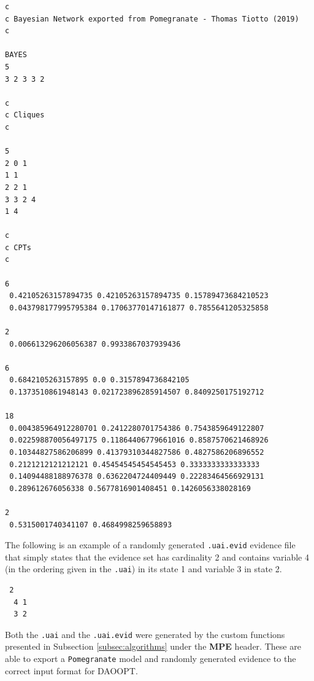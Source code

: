 \begin{minipage}{\linewidth}
\begin{framed}
\begin{verbatim}
c
c Bayesian Network exported from Pomegranate - Thomas Tiotto (2019)
c

BAYES
5
3 2 3 3 2 

c
c Cliques
c

5
2 0 1 
1 1 
2 2 1 
3 3 2 4 
1 4 

c
c CPTs
c

6
 0.42105263157894735 0.42105263157894735 0.15789473684210523 
 0.043798177995795384 0.17063770147161877 0.7855641205325858 

2
 0.006613296206056387 0.9933867037939436 

6
 0.6842105263157895 0.0 0.3157894736842105 
 0.1373510861948143 0.021723896285914507 0.8409250175192712 

18
 0.004385964912280701 0.2412280701754386 0.7543859649122807 
 0.022598870056497175 0.11864406779661016 0.8587570621468926 
 0.10344827586206899 0.41379310344827586 0.4827586206896552 
 0.2121212121212121 0.45454545454545453 0.3333333333333333 
 0.14094488188976378 0.6362204724409449 0.22283464566929131 
 0.289612676056338 0.5677816901408451 0.1426056338028169 

2
 0.5315001740341107 0.4684998259658893 
\end{verbatim}
\end{framed}
\end{minipage}

The following is an example of a randomly generated \texttt{.uai.evid} evidence file that simply states that the evidence set has cardinality 2 and contains variable 4 (in the ordering given in the \texttt{.uai}) in its state 1 and variable 3 in state 2.

\begin{framed}
\begin{verbatim}
 2
  4 1
  3 2
\end{verbatim}
\end{framed}

Both the \texttt{.uai} and the \texttt{.uai.evid} were generated by the custom functions presented in Subsection \ref{subsec:algorithms} under the \textbf{MPE} header.
These are able to export a \texttt{Pomegranate} model and randomly generated evidence to the correct input format for DAOOPT.

